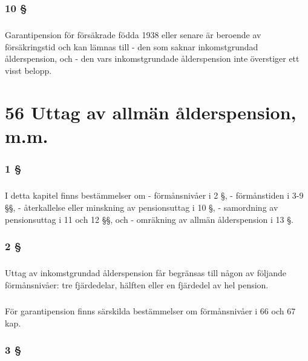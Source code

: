 \documentclass[a4paper,notitlepage,openany,10pt]{book}
\begin{document}
\subsection*{10 §}
\paragraph*{}
Garantipension för försäkrade födda 1938 eller senare är beroende av försäkringstid och kan lämnas till
\newline - den som saknar inkomstgrundad ålderspension, och
\newline - den vars inkomstgrundade ålderspension inte överstiger ett visst belopp.
\chapter*{56 Uttag av allmän ålderspension, m.m.}
\subsection*{1 §}
\paragraph*{}
I detta kapitel finns bestämmelser om
\newline - förmånsnivåer i 2 §,
\newline - förmånstiden i 3-9 §§,
\newline - återkallelse eller minskning av pensionsuttag i 10 §,
\newline - samordning av pensionsuttag i 11 och 12 §§, och
\newline - omräkning av allmän ålderspension i 13 §.
\subsection*{2 §}
\paragraph*{}
Uttag av inkomstgrundad ålderspension får begränsas till någon av följande förmånsnivåer: tre fjärdedelar, hälften eller en fjärdedel av hel pension.
\paragraph*{}
För garantipension finns särskilda bestämmelser om förmånsnivåer i 66 och 67 kap.
\subsection*{3 §}
\end{document}

